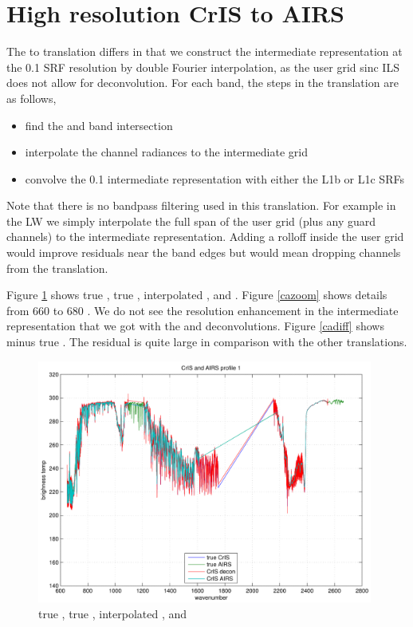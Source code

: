 \documentclass[12pt]{article}
\begin{document}
\FloatBarrier

\section{High resolution CrIS to AIRS}

The {\cris} to {\airs} translation differs in that we construct the
intermediate representation at the 0.1 {\wn} {\airs} SRF resolution
by double Fourier interpolation, as the {\cris} user grid sinc ILS
does not allow for deconvolution.  For each {\cris} band, the steps
in the translation are as follows,

\begin{itemize}
  \item find the {\airs} and {\cris} band intersection

  \item interpolate the {\cris} channel radiances to the intermediate
    grid 

   \item convolve the 0.1 {\wn} intermediate representation with either
    the {\airs} L1b or L1c SRFs
 
\end{itemize}

Note that there is no bandpass filtering used in this translation.
For example in the LW we simply interpolate the full span of the
{\cris} user grid (plus any guard channels) to the intermediate
representation.  Adding a rolloff inside the user grid would improve
residuals near the band edges but would mean dropping channels from
the translation.

Figure \ref{caspec} shows true {\cris}, true {\airs}, interpolated
{\cris}, and {\cris} {\airs}.  Figure \ref{cazoom} shows details
from 660 to 680 {\wn}.  We do not see the resolution enhancement in
the intermediate representation that we got with the {\iasi} and
{\airs} deconvolutions.  Figure \ref{cadiff} shows {\cris} {\airs}
minus true {\airs}.  The residual is quite large in comparison with
the other translations.

\begin{figure}
  \centering
  \includegraphics[height=8cm]{figures/cris_airs_spec.pdf}
  \caption{true {\cris}, true {\airs}, interpolated {\cris}, and
    {\cris} {\airs} }
  \label{caspec}
\end{figure}
\end{document}
